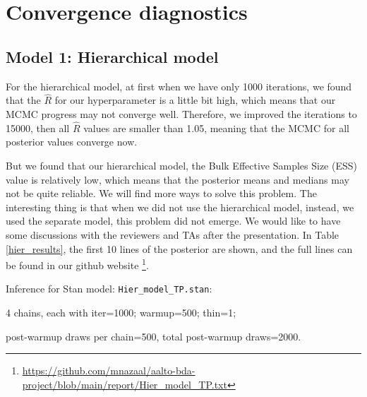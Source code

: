 \documentclass[a4paper]{artikel3}
\begin{document}
\section{Convergence diagnostics}
\subsection*{Model 1: Hierarchical model}
For the hierarchical model, at first when we have only 1000 iterations, we found that the $\hat{R}$ for our hyperparameter is a little bit high, which means that our MCMC progress may not converge well. Therefore, we improved the iterations to 15000, then all $\hat{R}$ values are smaller than 1.05, meaning that the MCMC for all posterior values converge now.  

But we found that our hierarchical model, the Bulk Effective Samples Size (ESS) value is relatively low, which means that the posterior means and medians may not be quite reliable. We will find more ways to solve this problem. The interesting thing is that when we did not use the hierarchical model, instead, we used the separate model, this problem did not emerge. We would like to have some discussions with the reviewers and TAs after the presentation. In Table \ref{hier_results}, the first 10 lines of the posterior are shown, and the full lines can be found in our github website \footnote{\url{https://github.com/mnazaal/aalto-bda-project/blob/main/report/Hier_model_TP.txt}}. 

Inference for Stan model: \texttt{Hier\_model\_TP.stan}:

4 chains, each with iter=1000; warmup=500; thin=1; 

post-warmup draws per chain=500, total post-warmup draws=2000.
\end{document}
